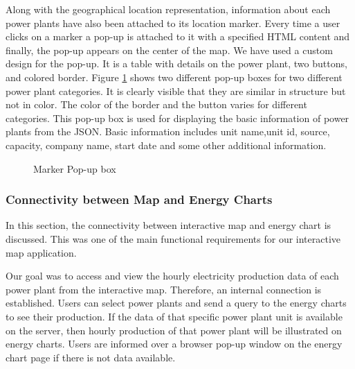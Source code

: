 Along with the geographical location representation, information about each power plants have also been attached to its location marker. Every time a user clicks on a marker a pop-up is attached to it with a specified HTML content and finally, the pop-up appears on the center of the map. We have used a custom design for the pop-up. It is a table with details on the power plant, two buttons, and colored border. Figure \ref{fig:mpp} shows two different pop-up boxes for two different power plant categories. It is clearly visible that they are similar in structure but not in color. The color of the border and the button varies for different categories. This pop-up box is used for displaying the basic information of power plants from the JSON. Basic information includes unit name,unit id, source, capacity, company name, start date and some other additional information. 


\begin{figure}
  \begin{center}
\hfill
{}
\hfill
\caption{Marker Pop-up box}
\label{fig:mpp}
\end{center}
\end{figure}

\subsubsection{Connectivity between Map and Energy Charts}
\label{sssec:connectivity}

In this section, the connectivity between interactive map and energy chart is discussed. This was one of the main functional requirements for our interactive map application.

Our goal was to access and view the hourly electricity production data of each power plant from the interactive map. Therefore, an internal connection is established. Users can select power plants and send a query to the energy charts to see their production. If the data of that specific power plant unit is available on the server, then hourly production of that power plant will be illustrated on energy charts. Users are informed over a browser pop-up window on the energy chart page if there is not data available.


